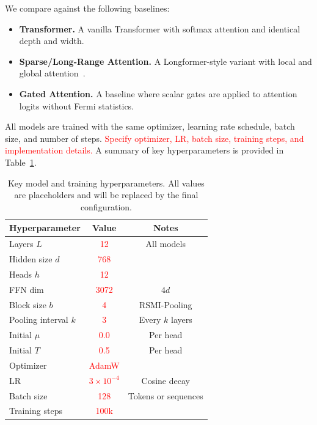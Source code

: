 \documentclass{article}
\newcommand{\TODO}[1]{\textcolor{red}{#1}}
\begin{document}
We compare against the following baselines:

\begin{itemize}[leftmargin=*]
    \item \textbf{Transformer.} A vanilla Transformer with softmax attention and identical depth and width.
    \item \textbf{Sparse/Long-Range Attention.} A Longformer-style variant with local and global attention~\cite{beltagy2020longformer}.
    \item \textbf{Gated Attention.} A baseline where scalar gates are applied to attention logits without Fermi statistics.
\end{itemize}

All models are trained with the same optimizer, learning rate schedule, batch size, and number of steps. \TODO{Specify optimizer, LR, batch size, training steps, and implementation details.} A summary of key hyperparameters is provided in Table~\ref{tab:hyperparams}.

\begin{table}[t]
    \centering
    \small
    \caption{Key model and training hyperparameters. All values are placeholders and will be replaced by the final configuration.}
    \label{tab:hyperparams}
    \begin{tabular}{lcc}
        \toprule
        Hyperparameter & Value & Notes \\
        \midrule
        Layers $L$ & \TODO{12} & All models \\
        Hidden size $d$ & \TODO{768} & \\
        Heads $h$ & \TODO{12} & \\
        FFN dim & \TODO{3072} & $4d$ \\
        Block size $b$ & \TODO{4} & RSMI-Pooling \\
        Pooling interval $k$ & \TODO{3} & Every $k$ layers \\
        Initial $\mu$ & \TODO{0.0} & Per head \\
        Initial $T$ & \TODO{0.5} & Per head \\
        Optimizer & \TODO{AdamW} & \\
        LR & \TODO{$3\times10^{-4}$} & Cosine decay \\
        Batch size & \TODO{128} & Tokens or sequences \\
        Training steps & \TODO{100k} & \\
        \bottomrule
    \end{tabular}
\end{table}
\end{document}
